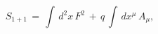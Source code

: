 \begin{equation}
\label{el1}
S_{1+1} \, = \,\int\, d^2x \, F^2 \, + \, q \, \int \, dx^{\mu}\,
A_{\mu},
\end{equation}


